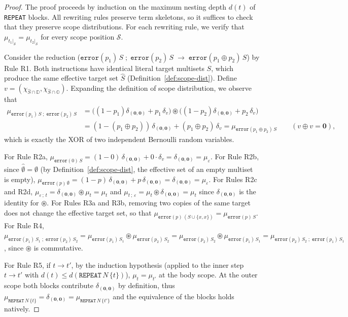 \documentclass[11pt,a4paper]{article}
\newcommand{\xorfold}{\oplus}          %
\newcommand{\tostep}{\to}
\newcommand{\dist}[1]{\mu_{#1}}   %
\begin{document}
\begin{proof}
The proof proceeds by induction on the maximum nesting depth $d(t)$ of \texttt{REPEAT} blocks. All rewriting rules preserve term skeletons, so it suffices to check that they preserve scope distributions. For each rewriting rule, we verify that $\dist{t_1|_{\mathcal{S}}} = \dist{t_2|_{\mathcal{S}}}$ for every scope position $\mathcal{S}$. 

Consider the reduction ($\mathtt{error}(p_1)\,S \;;\; \mathtt{error}(p_2)\,S \;\tostep\; \mathtt{error}(p_1 \xorfold p_2)\,S$) by Rule R1.
Both instructions have identical literal target multisets $S$, which produce the same effective target set $\widehat{S}$ (Definition~\ref{def:scope-dist}). Define $v = (\chi_{\widehat{S}\cap\mathbb{D}},\chi_{\widehat{S}\cap\mathbb{O}})$. Expanding the definition of scope distribution, we observe that 
\begin{align*}
  \dist{\mathtt{error}(p_1)\,S \;;\; \mathtt{error}(p_2)\,S}
  &= \bigl((1-p_1)\delta_{(\mathbf{0},\mathbf{0})} + p_1\,\delta_v\bigr) \circledast \bigl((1-p_2)\delta_{(\mathbf{0},\mathbf{0})} + p_2\,\delta_v\bigr) \\
  &=(1-(p_1\xorfold p_2))\,\delta_{(\mathbf{0},\mathbf{0})} + (p_1 \xorfold p_2)\,\delta_v
= \dist{\mathtt{error}(p_1 \xorfold p_2)\,S} \qquad (v \xorfold v = \mathbf{0}),
\end{align*}
which is exactly the XOR of two independent Bernoulli random variables.

For Rule R2a, $\dist{\mathtt{error}(0)\,S} = (1-0)\,\delta_{(\mathbf{0},\mathbf{0})} + 0\cdot\delta_v = \delta_{(\mathbf{0},\mathbf{0})} = \dist{\varepsilon}$. For Rule R2b, since $\widehat{\emptyset}=\emptyset$ (by Definition~\ref{def:scope-dist}, the effective set of an empty multiset is empty), $\dist{\mathtt{error}(p)\,\emptyset} = (1-p)\,\delta_{(\mathbf{0},\mathbf{0})} + p\,\delta_{(\mathbf{0},\mathbf{0})} = \delta_{(\mathbf{0},\mathbf{0})} = \dist{\varepsilon}$. For Rules R2c and R2d, $\dist{\varepsilon\,;\,t} = \delta_{(\mathbf{0},\mathbf{0})} \circledast \dist{t} = \dist{t}$ and $\dist{t\,;\,\varepsilon} = \dist{t} \circledast \delta_{(\mathbf{0},\mathbf{0})} = \dist{t}$ since $\delta_{(\mathbf{0},\mathbf{0})}$ is the identity for $\circledast$. For Rules R3a and R3b, removing two copies of the same target does not change the effective target set, so that $\dist{\mathtt{error}(p)\,(S \cup \{x,x\})} = \dist{\mathtt{error}(p)\,S}$. For Rule R4, $\dist{\mathtt{error}(p_1)\,S_1 \;;\; \mathtt{error}(p_2)\,S_2} = \dist{\mathtt{error}(p_1)\,S_1} \circledast \dist{\mathtt{error}(p_2)\,S_2} = \dist{\mathtt{error}(p_2)\,S_2} \circledast \dist{\mathtt{error}(p_1)\,S_1} = \dist{\mathtt{error}(p_2)\,S_2 \;;\; \mathtt{error}(p_1)\,S_1}$, since $\circledast$ is commutative.

For Rule R5, if $t \tostep t'$, by the induction hypothesis (applied to the inner step $t \tostep t'$ with $d(t) \le d(\mathtt{REPEAT}\,N\,\{t\})$), $\dist{t} = \dist{t'}$ at the body scope. At the outer scope both blocks contribute $\delta_{(\mathbf{0},\mathbf{0})}$ by definition, thus $\dist{\mathtt{REPEAT}\,N\,\{t\}} = \delta_{(\mathbf{0},\mathbf{0})} = \dist{\mathtt{REPEAT}\,N\,\{t'\}}$ and the equivalence of the blocks holds natively.
\end{proof}
\end{document}
